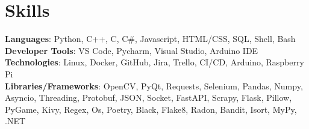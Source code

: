 \documentclass[letterpaper,11pt]{article}
\begin{document}
\section{Skills}
 \begin{itemize}[leftmargin=0.15in, label={}]
    \small{\item{
     \textbf{Languages}{: Python, C++, C, C\#, Javascript, HTML/CSS, SQL, Shell, Bash} \\
     \textbf{Developer Tools}{: VS Code, Pycharm, Visual Studio, Arduino IDE} \\
     \textbf{Technologies}{: Linux, Docker, GitHub, Jira, Trello, CI/CD, Arduino, Raspberry Pi} \\
      \textbf{Libraries/Frameworks}{: OpenCV, PyQt, Requests, Selenium, Pandas, Numpy, Asyncio, Threading, Protobuf, JSON, Socket, FastAPI, Scrapy, Flask, Pillow, PyGame, Kivy, Regex, Os, Poetry, Black, Flake8, Radon, Bandit, Isort, MyPy, .NET } \\
    }}
 \end{itemize}
 \vspace{-16pt}
\end{document}
